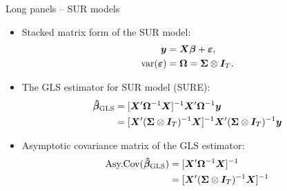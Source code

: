 \documentclass[usenames,dvipsnames]{beamer}
\begin{document}
\begin{frame}{Long panels -- SUR models}
\small
\begin{itemize}
    \item Stacked matrix form of the SUR model:\\
    \begin{align*}
        \bm{y} &= \bm{X} \bm{\beta} + \bm{\varepsilon},\\
        \textnormal{var}(\bm{\varepsilon}) &= \bm{\Omega} = \bm{\Sigma} \otimes \bm{I}_T.
    \end{align*}
    \item The GLS estimator for SUR model (SURE):
    \begin{align*}
        \bm{\hat{\beta}}_{\textnormal{GLS}} &= [\bm{X}^{\prime} \bm{\Omega}^{-1} \bm{X}]^{-1} \bm{X}^{\prime} \bm{\Omega}^{-1} \bm{y} \\
        &= [\bm{X}^{\prime} (\bm{\Sigma} \otimes \bm{I}_T)^{-1} \bm{X}]^{-1} \bm{X}^{\prime} (\bm{\Sigma} \otimes \bm{I}_T)^{-1} \bm{y} 
    \end{align*}
    \item Asymptotic covariance matrix of the GLS estimator:
    \begin{align*}
        \textnormal{Asy.Cov}(\bm{\hat{\beta}}_{\textnormal{GLS}}) &= [\bm{X}^{\prime} \bm{\Omega}^{-1} \bm{X}]^{-1}\\
        &= [\bm{X}^{\prime} (\bm{\Sigma} \otimes \bm{I}_T)^{-1} \bm{X}]^{-1} 
    \end{align*}
\end{itemize}
\end{frame}
\end{document}
